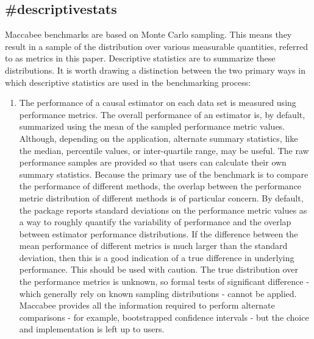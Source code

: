 \documentclass[./main.tex]{subfiles}
\begin{document}

\subsection*{\textbf{\#descriptivestats}}
\label{hc:descriptivestats}

Maccabee benchmarks are based on Monte Carlo sampling. This means they result in a sample of the distribution over various measurable quantities, referred to as metrics in this paper. Descriptive statistics are to summarize these distributions. It is worth drawing a distinction between the two primary ways in which descriptive statistics are used in the benchmarking process:

\begin{enumerate}
    \item The performance of a causal estimator on each data set is measured using performance metrics. The overall performance of an estimator is, by default, summarized using the mean of the sampled performance metric values. Although, depending on the application, alternate summary statistics, like the median, percentile values, or inter-quartile range, may be useful. The raw performance samples are provided so that users can calculate their own summary statistics. Because the primary use of the benchmark is to compare the performance of different methods, the overlap between the performance metric distribution of different methods is of particular concern. By default, the package reports standard deviations on the performance metric values as a way to roughly quantify the variability of performance and the overlap between estimator performance distributions. If the difference between the mean performance of different metrics is much larger than the standard deviation, then this is a good indication of a true difference in underlying performance. This should be used with caution. The true distribution over the performance metrics is unknown, so formal tests of significant difference - which generally rely on known sampling distributions - cannot be applied. Maccabee provides all the information required to perform alternate comparisons - for example, bootstrapped confidence intervals - but the choice and implementation is left up to users.
    
    \vspace{\baselineskip}
    

\end{enumerate}
\end{document}
